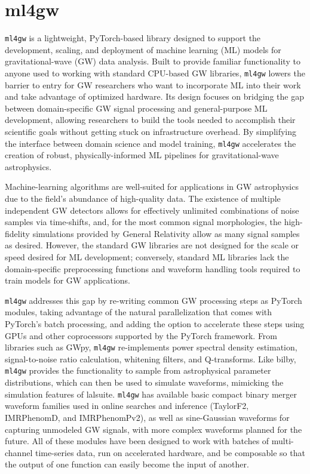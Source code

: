 \chapter{ml4gw}
\label{chap:ml4gw}

\begin{refsection}

\texttt{ml4gw} is a lightweight, PyTorch-based library designed to support the development, scaling, and deployment of machine learning (ML) models for gravitational-wave (GW) data analysis. 
Built to provide familiar functionality to anyone used to working with standard CPU-based GW libraries, \texttt{ml4gw} lowers the barrier to entry for GW researchers who want to incorporate ML into their work and take advantage of optimized hardware. 
Its design focuses on bridging the gap between domain-specific GW signal processing and general-purpose ML development, allowing researchers to build the tools needed to accomplish their scientific goals without getting stuck on infrastructure overhead. 
By simplifying the interface between domain science and model training, \texttt{ml4gw} accelerates the creation of robust, physically-informed ML pipelines for gravitational-wave astrophysics.

Machine-learning algorithms are well-suited for applications in GW astrophysics due to the field's abundance of high-quality data.
The existence of multiple independent GW detectors allows for effectively unlimited combinations of noise samples via time-shifts, and, for the most common signal morphologies, the high-fidelity simulations provided by General Relativity allow as many signal samples as desired.
However, the standard GW libraries are not designed for the scale or speed desired for ML development; conversely, standard ML libraries lack the domain-specific preprocessing functions and waveform handling tools required to train models for GW applications.

\texttt{ml4gw} addresses this gap by re-writing common GW processing steps as PyTorch\cite{paszke2019pytorch} modules, taking advantage of the natural parallelization that comes with PyTorch's batch processing, and adding the option to accelerate these steps using GPUs and other coprocessors supported by the PyTorch framework.
From libraries such as GWpy\cite{2019ascl.soft12016M}, \texttt{ml4gw} re-implements power spectral density estimation, signal-to-noise ratio calculation, whitening filters, and Q-transforms.
Like bilby\cite{bilby_paper}, \texttt{ml4gw} provides the functionality to sample from astrophysical parameter distributions, which can then be used to simulate waveforms, mimicking the simulation features of lalsuite\cite{lalsuite}.
\texttt{ml4gw} has available basic compact binary merger waveform families used in online searches and inference (TaylorF2, IMRPhenomD, and IMRPhenomPv2), as well as sine-Gaussian waveforms for capturing unmodeled GW signals, with more complex waveforms planned for the future.
All of these modules have been designed to work with batches of multi-channel time-series data, run on accelerated hardware, and be composable so that the output of one function can easily become the input of another.


\end{refsection}
